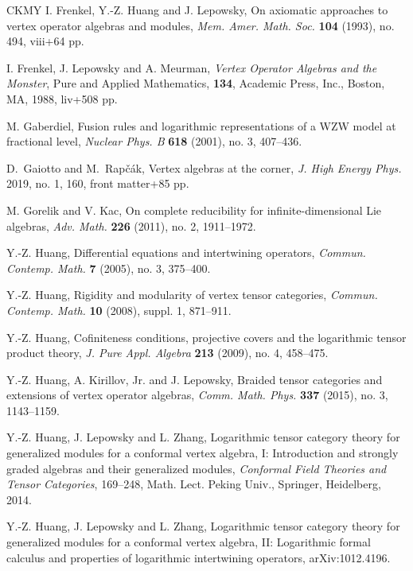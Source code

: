 \documentclass[11pt, reqno]{amsart}
\theoremstyle{definition}\newtheorem{defi}[thm]{Definition}
\theoremstyle{definition}\newtheorem{rem}[thm]{Remark}
\theoremstyle{definition}\newtheorem{exam}[thm]{Example}
\theoremstyle{definition}\newtheorem{assum}[thm]{Assumption}
\begin{document}
\begin{thebibliography}{CKMY}
I. Frenkel, Y.-Z. Huang and J. Lepowsky, On axiomatic approaches to vertex operator algebras
and modules, \textit{Mem. Amer. Math. Soc.} \textbf{104} (1993), no. 494, viii+64 pp.

I. Frenkel, J. Lepowsky and A. Meurman, \textit{Vertex Operator Algebras and the Monster}, Pure and Applied Mathematics, \textbf{134}, Academic Press, Inc., Boston, MA, 1988, liv+508 pp.

M. Gaberdiel, Fusion rules and logarithmic representations of a WZW model at fractional level, \textit{Nuclear Phys. B} \textbf{618} (2001), no. 3, 407--436.

D.~Gaiotto and M.~Rap\v{c}\'{a}k, Vertex algebras at the corner, \textit{J. High Energy Phys.} 2019, no. 1, 160, front matter+85 pp. 

M. Gorelik and V. Kac, On complete reducibility for infinite-dimensional Lie algebras, \textit{Adv. Math.} \textbf{226} (2011), no. 2, 1911--1972.

Y.-Z. Huang, Differential equations and intertwining operators, \textit{Commun. Contemp. Math.} \textbf{7} (2005), no. 3, 375--400.

Y.-Z. Huang,  Rigidity and modularity of vertex tensor categories, \textit{Commun. Contemp. Math.} \textbf{10} (2008), suppl. 1, 871--911.

Y.-Z. Huang, Cofiniteness conditions, projective covers and the logarithmic tensor product theory, \textit{J. Pure Appl. Algebra}  \textbf{213}  (2009), no. 4, 458--475.

Y.-Z. Huang, A. Kirillov, Jr. and J. Lepowsky, Braided tensor categories and extensions of vertex operator algebras, \textit{Comm. Math. Phys.} \textbf{337} (2015), no. 3, 1143--1159.

Y.-Z. Huang, J. Lepowsky and L. Zhang, Logarithmic tensor category theory for generalized modules for a conformal vertex algebra, I: Introduction and strongly graded algebras and their generalized modules, \textit{Conformal Field Theories and Tensor Categories}, 169--248, Math. Lect. Peking Univ., Springer, Heidelberg, 2014.
	
Y.-Z. Huang, J. Lepowsky and L. Zhang, Logarithmic tensor category theory for
generalized modules for a conformal vertex algebra, II: Logarithmic formal
calculus and properties of logarithmic intertwining operators, arXiv:1012.4196.
	

\end{thebibliography}
\end{document}
